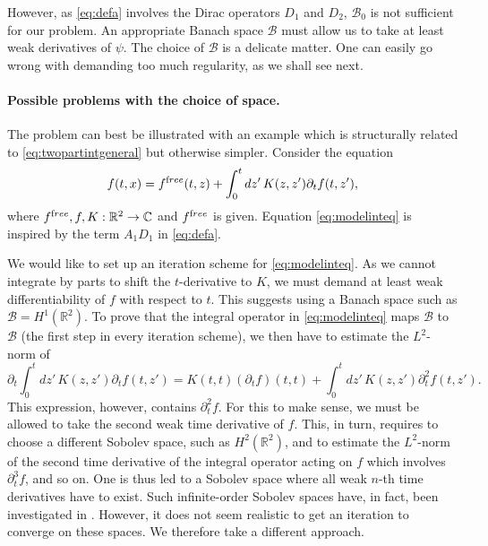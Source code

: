 \documentclass[b5paper,draft,openbib,12pt]{memoir}
\newcommand{\R}{\mathbb{R}}
\newcommand{\CC}{\mathbb{C}}
\newcommand{\free}{{\textup free}}
\newcommand{\Banach}{\mathscr{B}}
\begin{document}
However, as \eqref{eq:defa} involves the Dirac operators 
\(D_1\) and  \(D_2\), $\Banach_0$ is not sufficient for our 
problem. An appropriate Banach space $\Banach$ must allow 
us to take at least weak derivatives of $\psi$.  The choice 
of $\Banach$ is a delicate matter. One can easily go wrong 
with demanding too much regularity, as we shall see 
next.

\paragraph{Possible problems with the choice of space.}


The problem can best be illustrated with an example which is structurally related to \eqref{eq:twopartintgeneral} but otherwise simpler. Consider the equation
\begin{equation}
	f(t,x) = f^\free(t,z) + \int_0^t dz' \, K(z,z') \partial_t f(t,z'),
	\label{eq:modelinteq}
\end{equation}
where $f^\free, f, K : \R^2 \rightarrow \CC$ and $f^\free$ 
is given. Equation \eqref{eq:modelinteq} is inspired 
by the term 
$A_1 D_1$ in \eqref{eq:defa}.

We would like to set up an iteration scheme for 
\eqref{eq:modelinteq}. As we cannot integrate by parts to 
shift the $t$-derivative to $K$, we must demand at least 
weak differentiability of $f$ with respect to $t$. This 
suggests using a Banach space such as $\Banach = H^1(\R^2)$.
To prove that the integral operator in \eqref{eq:modelinteq} 
maps $\Banach$ to $\Banach$ (the first step in every 
iteration scheme), we then have to estimate the $L^2$-norm of
\begin{equation}
	\partial_t \int_0^t dz' \, K(z,z') \partial_t f(t,z') = K(t,t) (\partial_t f)(t,t) + \int_0^t dz' \, K(z,z') \partial_t^2 f(t,z').
\end{equation}
This expression, however, contains $\partial_t^2 f$. For this to make sense, we must be allowed to take the second weak time derivative of $f$. This, in turn, requires to choose a different Sobolev space, such as $H^2(\R^2)$, and to estimate the $L^2$-norm of the second time derivative of the integral operator acting on $f$ which involves $\partial_t^3 f$, and so on. One is thus led to a Sobolev space where all weak $n$-th time derivatives have to exist. Such infinite-order Sobolev spaces have, in fact, been investigated in \cite{dubinskii_1991}. However, it does not seem realistic to get an iteration to converge on these spaces. We therefore take a different approach. 
\end{document}
